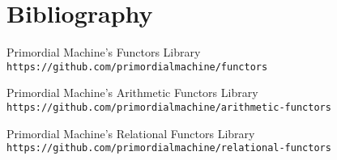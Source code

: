 %
%
%
%
%
%
%

\chapter{Bibliography}

\nocite{*} %

\begin{thebibliography}{9}
Primordial Machine's Functors Library 
\\\texttt{https://github.com/primordialmachine/functors}

Primordial Machine's Arithmetic Functors Library 
\\\texttt{https://github.com/primordialmachine/arithmetic-functors}

Primordial Machine's Relational Functors Library 
\\\texttt{https://github.com/primordialmachine/relational-functors}

\end{thebibliography}
